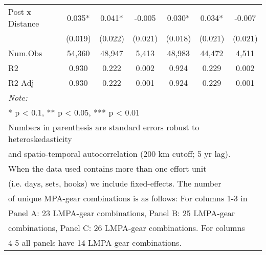 \begin{table}
\begin{tabular}[t]{lcccccc}
\addlinespace[0.5cm]
\multicolumn{7}{l}{Panel C: 0-600 nautical miles}\\
\hline
\hspace{1em}Post x Distance & 0.035* & 0.041* & -0.005 & 0.030* & 0.034* & -0.007\\
\hspace{1em} & (0.019) & (0.022) & (0.021) & (0.018) & (0.021) & (0.021)\\
\hspace{1em}Num.Obs & 54,360 & 48,947 & 5,413 & 48,983 & 44,472 & 4,511\\
\hspace{1em}R2 & 0.930 & 0.222 & 0.002 & 0.924 & 0.229 & 0.002\\
\hspace{1em}R2 Adj & 0.930 & 0.222 & 0.001 & 0.924 & 0.229 & 0.001\\
\bottomrule
\multicolumn{7}{l}{\rule{0pt}{1em}\textit{Note: }}\\
\multicolumn{7}{l}{\rule{0pt}{1em}* p < 0.1, ** p < 0.05, *** p < 0.01}\\
\multicolumn{7}{l}{\rule{0pt}{1em}Numbers in parenthesis are standard errors robust to heteroskedasticity}\\
\multicolumn{7}{l}{\rule{0pt}{1em}and spatio-temporal autocorrelation (200 km cutoff; 5 yr lag).}\\
\multicolumn{7}{l}{\rule{0pt}{1em}When the data used contains more than one effort unit}\\
\multicolumn{7}{l}{\rule{0pt}{1em}(i.e. days, sets, hooks) we include fixed-effects. The number}\\
\multicolumn{7}{l}{\rule{0pt}{1em}of unique MPA-gear combinations is as follows: For columns 1-3 in}\\
\multicolumn{7}{l}{\rule{0pt}{1em}Panel A: 23 LMPA-gear combinations, Panel B: 25 LMPA-gear}\\
\multicolumn{7}{l}{\rule{0pt}{1em}combinations, Panel C: 26 LMPA-gear combinations. For columns}\\
\multicolumn{7}{l}{\rule{0pt}{1em}4-5 all panels have 14 LMPA-gear combinations.}\\
\end{tabular}
\end{table}